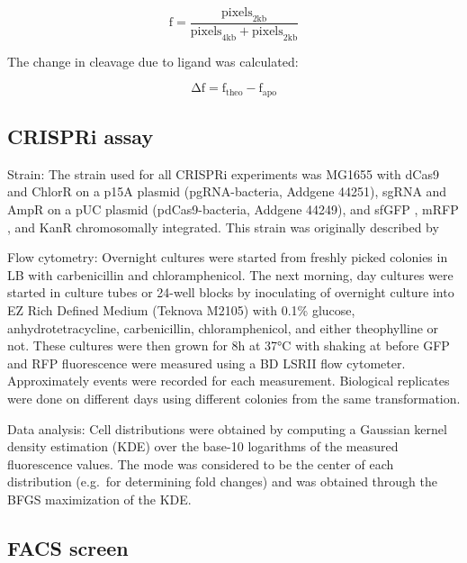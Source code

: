 \documentclass[10pt,oneside]{article}
\begin{document}
\begin{displaymath}
 \mathrm{f} = \frac{\mathrm{pixels}_\mathrm{2kb}}{\mathrm{pixels}_\mathrm{4kb} + \mathrm{pixels}_\mathrm{2kb}}
\end{displaymath}

The change in cleavage due to ligand was calculated: 

\begin{displaymath}
 \mathrm{Δf} = \mathrm{f}_\mathrm{theo} - \mathrm{f}_\mathrm{apo}
\end{displaymath}

\subsection{CRISPRi assay}

Strain: The strain used for all CRISPRi experiments was \ecoli{} MG1655 with dCas9 and ChlorR on a p15A plasmid (pgRNA-bacteria, Addgene 44251), sgRNA and AmpR on a pUC plasmid (pdCas9-bacteria, Addgene 44249), and sfGFP \autocite{pedelacq2006}, mRFP \autocite{campbell2002}, and KanR chromosomally integrated.  This strain was originally described by 

Flow cytometry: Overnight cultures were started from freshly picked colonies in  LB with  carbenicillin and  chloramphenicol.  The next morning, day cultures were started in  culture tubes or 24-well blocks by inoculating  of overnight culture into  EZ Rich Defined Medium (Teknova M2105) with 0.1\% glucose,  an\-hydro\-tetra\-cycline,  carbenicillin,  chloramphenicol, and either  theophylline or not.  These cultures were then grown for 8h at 37°C with shaking at  before GFP and RFP fluorescence were measured using a BD LSRII flow cytometer.  Approximately \unit[10,000]{events} were recorded for each measurement.  Biological replicates were done on different days using different colonies from the same transformation.

Data analysis: Cell distributions were obtained by computing a Gaussian kernel density estimation (KDE) over the base-10 logarithms of the measured fluorescence values.  The mode was considered to be the center of each distribution (e.g.\ for determining fold changes) and was obtained through the BFGS maximization of the KDE.

\subsection{FACS screen}
\end{document}
